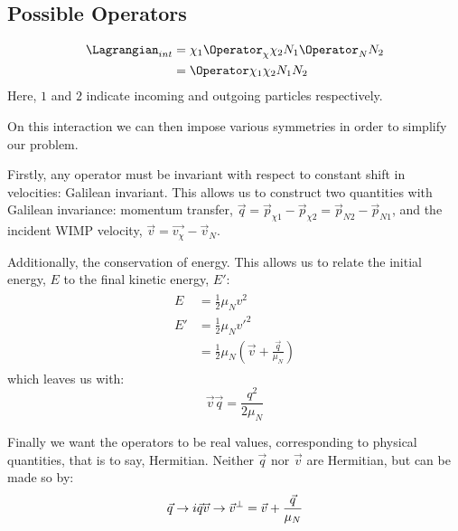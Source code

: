 \subsection{Possible Operators}
\par

\begin{align}
\begin{split}
    \Lagrangian_{int} &= \chi_{1} \Operator_{\chi} \chi_{2} N_{1} \Operator_{N} N_{2} \\
                      &= \Operator \chi_{1}\chi_{2} N_{1}N_{2}
\end{split}
\end{align}
Here, $1$ and $2$ indicate incoming and outgoing particles respectively.

\par
On this interaction we can then impose various symmetries in order to simplify our problem.

\par
Firstly, any operator must be invariant with respect to constant shift in velocities: Galilean invariant.
This allows us to construct two quantities with Galilean invariance: momentum transfer, $\vec{q} = \vec{p}_{\chi 1} - \vec{p}_{\chi 2} = \vec{p}_{N 2} - \vec{p}_{N 1}$, and the incident WIMP velocity, $\vec{v}=\vec{v_\chi} - \vec{v}_N$.

\par
Additionally, the conservation of energy.
This allows us to relate the initial energy, $E$ to the final kinetic energy, $E'$:
\begin{align}
\begin{split}
    E  &= \frac{1}{2}\mu_N v^2 \\
    E' &= \frac{1}{2}\mu_N v'^2 \\
       &= \frac{1}{2}\mu_N (\vec{v} + \frac{\vec{q}}{\mu_N})
\end{split}
\end{align}
which leaves us with:
\begin{equation}
    \vec{v}\vec{q} = \frac{q^2}{2\mu_N}
\end{equation}

\par
Finally we want the operators to be real values, corresponding to physical quantities, that is to say, Hermitian.
Neither $\vec{q}$ nor $\vec{v}$ are Hermitian, but can be made so by:
\begin{equation}
    \vec{q} \rightarrow i\vec{q} \\
    \vec{v} \rightarrow \vec{v}^{\bot} = \vec{v} + \frac{\vec{q}}{\mu_N}
\end{equation}


